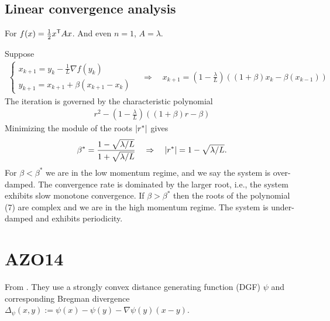 \documentclass[12pt,english]{article}
\begin{document}
\subsection{Linear convergence analysis}\label{subsec:}
%
For $f(x) = \frac12 x^{\mathsf{T}} A x$. And even $n=1$, $A=\lambda$.

Suppose
%
\begin{align*}
%
\left\{
\begin{aligned}
x_{k+1} = y_k - \frac{1}{L}\nabla f(y_k)\\
y_{k+1} = x_{k+1} + \beta(x_{k+1}-x_{k})
\end{aligned}
\right.
\quad\Rightarrow\quad 
x_{k+1} =  (1-\frac{\lambda}{L}) \left( (1+\beta)x_{k} - \beta(x_{k-1})\right)
\end{align*}
%
The iteration is governed by the characteristic polynomial
%
\begin{align*}
r^2 - (1-\frac{\lambda}{L}) \left( (1+\beta)r - \beta\right)
\end{align*}
%
Minimizing the module of the roots $\left\vert{r^*}\right\vert$ gives
%
\begin{align*}
\beta^* = \frac{1-\sqrt{\lambda/L}}{1+\sqrt{\lambda/L}}\quad\Rightarrow\quad 
\left\vert{r^*}\right\vert = 1 -\sqrt{\lambda/L}.
\end{align*}
%
For $\beta<\beta^*$ we are in the low momentum regime, and we say the system is over- damped. The convergence rate is dominated by the larger root, i.e., the system exhibits slow monotone convergence.
If  $\beta>\beta^*$ then the roots of the polynomial (7) are complex and we are in the high momentum regime. The system is under-damped and exhibits periodicity.

%
\section{AZO14}\label{sec:}
%
From \cite{Allen-ZhuOrecchia14}. They use a strongly convex distance generating function (DGF) $\psi$ and corresponding Bregman divergence $\Delta_{\psi}(x,y) := \psi(x)-\psi(y)-\nabla\psi(y)(x-y)$.
\end{document}
